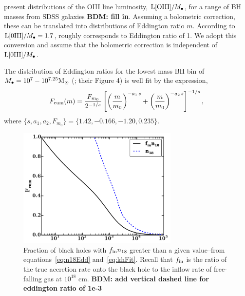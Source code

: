 \documentclass[usenatbib,fleqn]{mnras}
\newcommand\lsim{\mathrel{\rlap{\lower4pt\hbox{\hskip1pt$\sim$}}
    \raise1pt\hbox{$<$}}}
\newcommand\gsim{\mathrel{\rlap{\lower4pt\hbox{\hskip1pt$\sim$}}
    \raise1pt\hbox{$>$}}}
\newcommand{\Mbh}[1][]{M_{\bullet#1}}
\newcommand{\Msun}{{\rm M_\odot}}
\begin{document}
\citet{Kauffmann+2009} present distributions of the OIII line luminosity, ${\rm L[OIII]}/\Mbh$,
for a range of BH masses from SDSS galaxies {\bf BDM: fill in}.  Assuming a bolometric correction, these can be translated into distributions of Eddington ratio $m$.  According to \citet{Kauffmann+2009} ${\rm
  L[0III]}/\Mbh=1.7$, roughly corresponds to Eddington ratio of 1. We
adopt this conversion and assume that the bolometric correction is
independent of ${\rm L[0III]}/\Mbh$.

The distribution of Eddington ratios for the lowest mass BH bin of $M_{\bullet} = 10^7 - 10^{7.25} \Msun$ (\citealt{Kauffmann+2009}; their Figure 4) is well fit by the expression,
\begin{align}
  F_{\rm cum}(m)=\frac{F_{m_0}}{2^{-1/s}}
  \left[\left(\frac{m}{m_0}\right)^{-a_1\,
      s}+\left(\frac{m}{m_0}\right)^{-a_2 \, s}\right]^{-1/s} \label{eq:khFit},
\end{align}
where $\{s, a_1, a_2, F_{m_0}\} =\{1.42, -0.166, -1.20, 0.235\}$.

\begin{figure}
\includegraphics[width=8cm]{fcum_n18.pdf}
\caption{\label{fig:n18Cum} Fraction of black holes with $f_{\rm in}
  n_{18}$ greater than a given value--from equations~\eqref{eq:n18Edd}
  and~\eqref{eq:khFit}. Recall that $f_{\rm in}$ is the ratio of the
  true accretion rate onto the black hole to the inflow rate of
  free-falling gas at $10^{18}$ cm.   {\bf BDM: add vertical dashed line for eddington ratio of 1e-3}
}
\end{figure}
\end{document}
